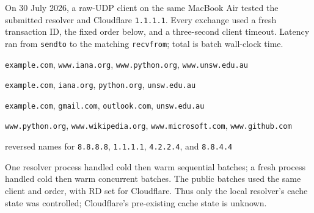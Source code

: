 \documentclass[11pt,a4paper]{article}
\newcommand{\code}[1]{\texttt{#1}}
\begin{document}
On 30 July 2026, a raw-UDP client on the same MacBook Air tested the submitted
resolver and Cloudflare \code{1.1.1.1}. Every exchange used a fresh transaction
ID, the fixed order below, and a three-second client timeout. Latency ran from
\code{sendto} to the matching \code{recvfrom}; total is batch wall-clock time.

\begin{description}[leftmargin=5.5em, style=nextline, itemsep=0.1em]
    \item[A] \code{example.com}, \code{www.iana.org},
    \code{www.python.org}, \code{www.unsw.edu.au}
    \item[NS] \code{example.com}, \code{iana.org}, \code{python.org},
    \code{unsw.edu.au}
    \item[MX] \code{example.com}, \code{gmail.com}, \code{outlook.com},
    \code{unsw.edu.au}
    \item[CNAME] \code{www.python.org}, \code{www.wikipedia.org},
    \code{www.microsoft.com}, \code{www.github.com}
    \item[PTR] reversed names for \code{8.8.8.8}, \code{1.1.1.1},
    \code{4.2.2.4}, and \code{8.8.4.4}
\end{description}

One resolver process handled cold then warm sequential batches; a fresh process
handled cold then warm concurrent batches. The public batches used the same
client and order, with RD set for Cloudflare. Thus only the local resolver's
cache state was controlled; Cloudflare's pre-existing cache state is unknown.
\end{document}
